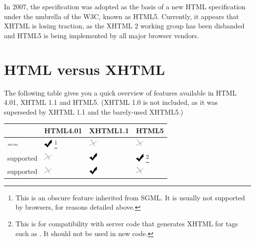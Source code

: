 \documentclass[a4paper,12pt]{sphinxmanual}
\begin{document}
In 2007, the specification was adopted as the basis of a new HTML
specification under the umbrella of the W3C, known as HTML5.  Currently,
it appears that XHTML is losing traction, as the XHTML 2 working group has
been disbanded and HTML5 is being implemented by all major browser vendors.


\section{HTML versus XHTML}
\label{htmlfaq:html-versus-xhtml}
The following table gives you a quick overview of features available in
HTML 4.01, XHTML 1.1 and HTML5. (XHTML 1.0 is not included, as it was
superseded by XHTML 1.1 and the barely-used XHTML5.)

\begin{tabulary}{\linewidth}{|p{9cm}|p{2cm}|p{2cm}|p{2cm}|}
\hline
\textbf{} & \textbf{
HTML4.01
} & \textbf{
XHTML1.1
} & \textbf{
HTML5
}\\\hline

 == 
 & 
\includegraphics{yes.png} \footnote{
This is an obscure feature inherited from SGML. It is usually not
supported by browsers, for reasons detailed above.
}
 & 
\includegraphics{no.png}
 & 
\includegraphics{no.png}
\\\hline

 supported
 & 
\includegraphics{no.png}
 & 
\includegraphics{yes.png}
 & 
\includegraphics{yes.png} \footnote{
This is for compatibility with server code that generates XHTML for
tags such as .  It should not be used in new code.
}
\\\hline

 supported
 & 
\includegraphics{no.png}
 & 
\includegraphics{yes.png}
 & 
\includegraphics{no.png}
\\\hline


\end{tabulary}
\end{document}
